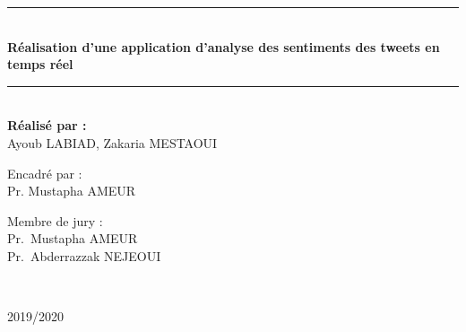 \begin{center}
\rule{\linewidth}{0.3mm} \\[0.2cm]
{ \huge \bfseries Réalisation d'une application d'analyse des sentiments des tweets en temps réel \\[0.2cm] }
\rule{\linewidth}{0.3mm} \\[0.7cm]
{\large \bfseries Réalisé par :}\\[0.2cm]
Ayoub LABIAD, Zakaria MESTAOUI \\[5cm]
\noindent
\begin{minipage}{0.4\textwidth}
  \begin{flushleft} \large
    {\color{orange!80!black}Encadré par :}\\
    Pr. Mustapha AMEUR\\
  \end{flushleft}
\end{minipage}%
\begin{minipage}{0.5\textwidth}
  \begin{flushright} \large
    {\color{orange!80!black}Membre de jury :} \\
    Pr.~Mustapha \textsc{AMEUR}\\
    Pr.~Abderrazzak \textsc{NEJEOUI}\\
  \end{flushright}
\end{minipage}\\[1cm]

\vfill

2019/2020

\end{center}